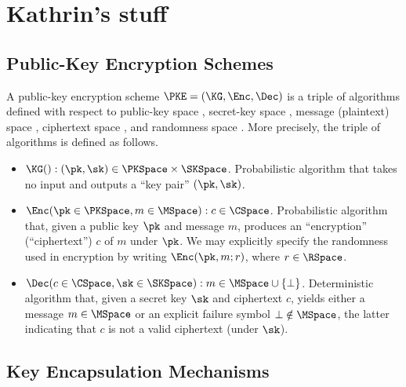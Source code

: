 \section{Kathrin's stuff}


\subsection{Public-Key Encryption Schemes}\label{app:FO-etc:PKE}
	
	\begin{definition}\label{def:PKE}
		A public-key encryption scheme $\PKE = (\KG, \Enc, \Dec)$ is a triple of algorithms
		defined with respect to public-key space \PKSpace, secret-key space \SKSpace,
		message (plaintext) space \MSpace, ciphertext space \CSpace,
		and randomness space \RSpace.
		More precisely, the triple of algorithms is defined as follows.
		\begin{itemize}
			\item
				$\KG() : (\pk, \sk) \in \PKSpace \times \SKSpace$.
				Probabilistic algorithm that takes no input and outputs a ``key pair'' $(\pk, \sk)$.
			\item
				$\Enc(\pk \in \PKSpace, m \in \MSpace) : c \in \CSpace$.
				Probabilistic algorithm that, given a public key $\pk$ and message $m$,
				produces an ``encryption'' (``ciphertext'') $c$ of $m$ under $\pk$.
				We may explicitly specify the randomness used in encryption by writing $\Enc(\pk, m; r)$,
				where $r \in \RSpace$.
			\item
				$\Dec(c \in \CSpace, \sk \in \SKSpace) : m \in \MSpace \cup \{\bot\}$.
				Deterministic algorithm that, given a secret key $\sk$ and ciphertext $c$,
				yields either a message $m \in \MSpace$ or an explicit failure symbol $\bot \notin \MSpace$,
				the latter indicating that $c$ is not a valid ciphertext (under $\sk$).
		\end{itemize}
	\end{definition}
	

\subsection{Key Encapsulation Mechanisms}\label{app:FO-etc:KEMs}
	
